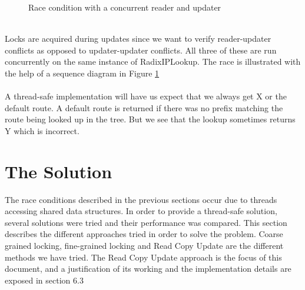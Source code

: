 \documentclass{article}
\begin{document}
\begin{figure}[tph]
\caption{Race condition with a concurrent reader and updater}
\label{race_readerfigure}
\end{figure}
\\
Locks are acquired during updates since we want to verify reader-updater conflicts as opposed to updater-updater conflicts. All three of these are run concurrently on the same instance of RadixIPLookup. The race is illustrated with the help of a sequence diagram in Figure \ref{race_readerfigure}
\\\\A thread-safe implementation will have us expect that we always get X or the default route. A default route is returned if there was no prefix matching the route being looked up in the tree. But we see that the lookup sometimes returns Y which is incorrect.
\section{The Solution}
The race conditions described in the previous sections occur due to threads accessing shared data structures. In order to provide a thread-safe solution, several solutions were tried and their performance was compared. This section describes the different approaches tried in order to solve the problem. Coarse grained locking, fine-grained locking and Read Copy Update are the different methods we have tried. The Read Copy Update approach is the focus of this document, and a justification of its working and the implementation details are exposed in section 6.3
\end{document}
